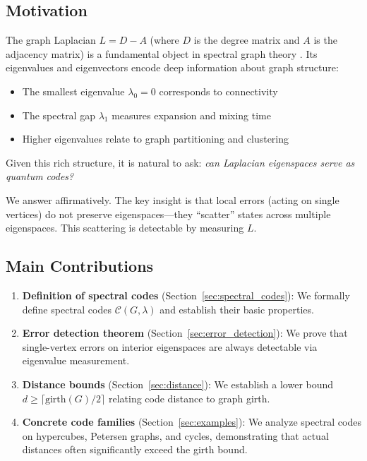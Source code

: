 \documentclass[11pt,a4paper]{article}
\theoremstyle{definition}
\newcommand{\gmark}{\mathrm{girth}}
\newcommand{\codespace}{\mathcal{C}}
\begin{document}
\subsection{Motivation}

The graph Laplacian $L = D - A$ (where $D$ is the degree matrix and $A$ is the adjacency matrix) is a fundamental object in spectral graph theory \cite{chung1997spectral}. Its eigenvalues and eigenvectors encode deep information about graph structure:
\begin{itemize}[noitemsep]
    \item The smallest eigenvalue $\lambda_0 = 0$ corresponds to connectivity
    \item The spectral gap $\lambda_1$ measures expansion and mixing time
    \item Higher eigenvalues relate to graph partitioning and clustering
\end{itemize}

Given this rich structure, it is natural to ask: \emph{can Laplacian eigenspaces serve as quantum codes?}

We answer affirmatively. The key insight is that local errors (acting on single vertices) do not preserve eigenspaces---they ``scatter'' states across multiple eigenspaces. This scattering is detectable by measuring $L$.

\subsection{Main Contributions}

\begin{enumerate}[noitemsep]
    \item \textbf{Definition of spectral codes} (Section~\ref{sec:spectral_codes}): We formally define spectral codes $\codespace(G, \lambda)$ and establish their basic properties.
    
    \item \textbf{Error detection theorem} (Section~\ref{sec:error_detection}): We prove that single-vertex errors on interior eigenspaces are always detectable via eigenvalue measurement.
    
    \item \textbf{Distance bounds} (Section~\ref{sec:distance}): We establish a lower bound $d \geq \lceil \gmark(G)/2 \rceil$ relating code distance to graph girth.
    
    \item \textbf{Concrete code families} (Section~\ref{sec:examples}): We analyze spectral codes on hypercubes, Petersen graphs, and cycles, demonstrating that actual distances often significantly exceed the girth bound.
\end{enumerate}
\end{document}
